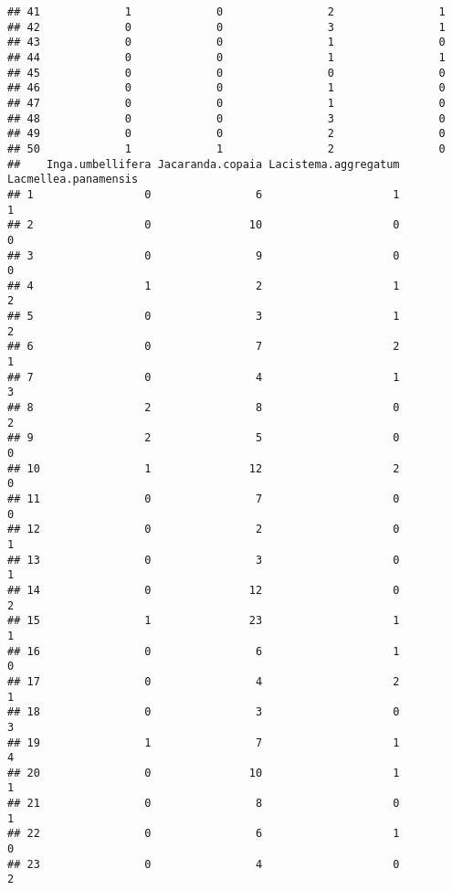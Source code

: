 \documentclass[
]{article}
\begin{document}
\begin{verbatim}
## 41             1             0                2                1
## 42             0             0                3                1
## 43             0             0                1                0
## 44             0             0                1                1
## 45             0             0                0                0
## 46             0             0                1                0
## 47             0             0                1                0
## 48             0             0                3                0
## 49             0             0                2                0
## 50             1             1                2                0
##    Inga.umbellifera Jacaranda.copaia Lacistema.aggregatum Lacmellea.panamensis
## 1                 0                6                    1                    1
## 2                 0               10                    0                    0
## 3                 0                9                    0                    0
## 4                 1                2                    1                    2
## 5                 0                3                    1                    2
## 6                 0                7                    2                    1
## 7                 0                4                    1                    3
## 8                 2                8                    0                    2
## 9                 2                5                    0                    0
## 10                1               12                    2                    0
## 11                0                7                    0                    0
## 12                0                2                    0                    1
## 13                0                3                    0                    1
## 14                0               12                    0                    2
## 15                1               23                    1                    1
## 16                0                6                    1                    0
## 17                0                4                    2                    1
## 18                0                3                    0                    3
## 19                1                7                    1                    4
## 20                0               10                    1                    1
## 21                0                8                    0                    1
## 22                0                6                    1                    0
## 23                0                4                    0                    2

\end{verbatim}
\end{document}
